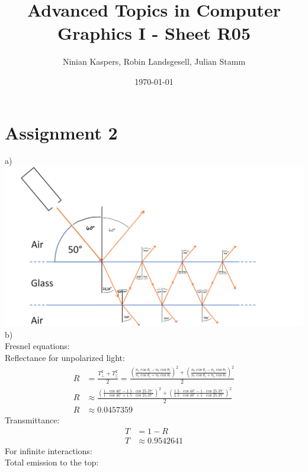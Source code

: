 \documentclass{article}
\title{Advanced Topics in Computer Graphics I - Sheet R05}
\author{Ninian Kaspers, Robin Landsgesell, Julian Stamm}
\date{\today}
\begin{document}
    \maketitle

    \section*{Assignment 2}

    a)\\
    \includegraphics[width=\textwidth]{2a.png}
    \\
    b)\\
    Fresnel equations:\\
    Reflectance for unpolarized light:\\
    \begin{align*}
        R &= \frac{T_\perp^2  + T_\parallel^2}{2} = \frac{\left(\frac{n_i \cos{\theta_i} - n_t \cos{\theta_t}}{n_i \cos{\theta_i} + n_t \cos{\theta_t}}\right)^2 + \left(\frac{n_t \cos{\theta_i} - n_i \cos{\theta_t}}{n_t \cos{\theta_i} + n_i \cos{\theta_t}}\right)^2}{2}\\
        R &\approx \frac{\left(\frac{1 \cdot \cos{40^\circ} - 1.5 \cdot \cos{25.37^\circ}}{1 \cdot \cos{40^\circ} + 1.5 \cdot \cos{25.37^\circ}}\right)^2 + \left(\frac{1.5 \cdot \cos{40^\circ} - 1 \cdot \cos{25.37^\circ}}{1.5 \cdot \cos{40^\circ} + 1 \cdot \cos{25.37^\circ}}\right)^2}{2}\\
        R &\approx 0.0457359
    \end{align*}
    Transmittance:
    \begin{align*}
        T &= 1 - R\\
        T &\approx 0.9542641
    \end{align*}
    For infinite interactions:\\
    Total emission to the top:\\
\end{document}
